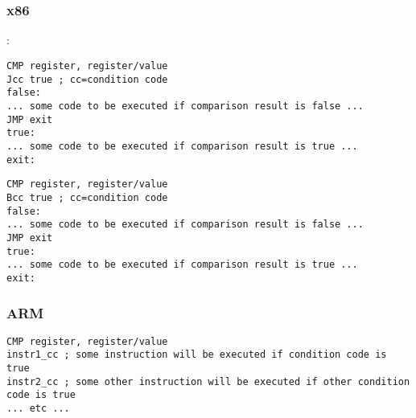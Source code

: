 \chapter{}
\label{sec:Jcc}



\section{\Conclusion{}}

\subsection{x86}

:

\begin{lstlisting}[caption=x86]
CMP register, register/value
Jcc true ; cc=condition code
false:
... some code to be executed if comparison result is false ...
JMP exit 
true:
... some code to be executed if comparison result is true ...
exit:
\end{lstlisting}

\begin{lstlisting}[caption=ARM]
CMP register, register/value
Bcc true ; cc=condition code
false:
... some code to be executed if comparison result is false ...
JMP exit 
true:
... some code to be executed if comparison result is true ...
exit:
\end{lstlisting}

\subsection{ARM}


\begin{lstlisting}[caption=ARM (\ARMMode)]
CMP register, register/value
instr1_cc ; some instruction will be executed if condition code is true
instr2_cc ; some other instruction will be executed if other condition code is true
... etc ...
\end{lstlisting}


